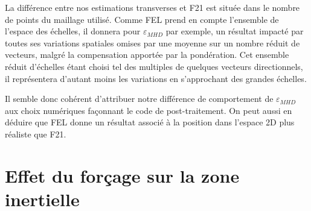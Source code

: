 La différence entre nos estimations transverses et \ac{F21} est située dans le nombre de points du maillage utilisé. Comme \ac{FEL} prend en compte l'ensemble de l'espace des échelles, il donnera pour $\varepsilon_{MHD}$ par exemple, un résultat impacté par toutes ses variations spatiales omises par une moyenne sur un nombre réduit de vecteurs, malgré la compensation apportée par la pondération. Cet ensemble réduit d'échelles étant choisi tel des multiples de quelques vecteurs directionnels, il représentera d'autant moins les variations en s'approchant des grandes échelles.

Il semble donc cohérent d'attribuer notre différence de comportement de $\varepsilon_{MHD}$ aux choix numériques façonnant le code de post-traitement. On peut aussi en déduire que \ac{FEL} donne un résultat associé à la position dans l'espace \ac{2D} plus réaliste que \ac{F21}.

\section{Effet du forçage sur la zone inertielle} \label{sec-322}

